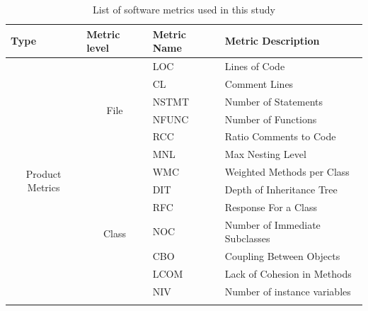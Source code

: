 \documentclass[sigconf]{acmart}
\theoremstyle{break}
\begin{document}
\small{
\begin{table}[]
\caption{List of software metrics used in this study}
\label{tbl:metric}
\begin{tabular}{|c|c|l|p{2cm}|}
\hline
\multicolumn{1}{|l|}{Type}        & \multicolumn{1}{l|}{Metric level} & Metric Name & Metric Description             \\ \hline
\multirow{21}{*}{Product Metrics} & \multirow{6}{*}{File}             & LOC         & Lines of Code                  \\ \cline{3-4} 
                                  &                                   & CL          & Comment Lines                  \\ \cline{3-4} 
                                  &                                   & NSTMT       & Number of Statements           \\ \cline{3-4} 
                                  &                                   & NFUNC       & Number of Functions            \\ \cline{3-4} 
                                  &                                   & RCC         & Ratio Comments to Code         \\ \cline{3-4} 
                                  &                                   & MNL         & Max Nesting Level              \\ \cline{2-4} 
                                  & \multirow{12}{*}{Class}           & WMC         & Weighted Methods per Class     \\ \cline{3-4} 
                                  &                                   & DIT         & Depth of Inheritance Tree      \\ \cline{3-4} 
                                  &                                   & RFC         & Response For a Class           \\ \cline{3-4} 
                                  &                                   & NOC         & Number of Immediate Subclasses \\ \cline{3-4} 
                                  &                                   & CBO         & Coupling Between Objects       \\ \cline{3-4} 
                                  &                                   & LCOM        & Lack of Cohesion in Methods    \\ \cline{3-4} 
                                  &                                   & NIV         & Number of instance variables   \\ \cline{3-4} 

\end{tabular}
\end{table}}
\end{document}
